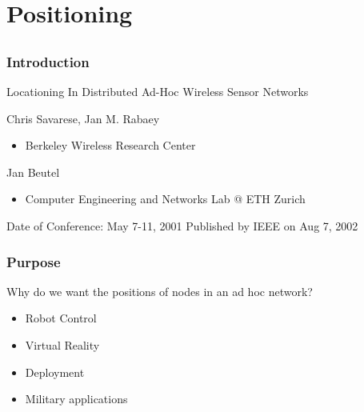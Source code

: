 \section{Positioning}
\subsection*{}


\begin{frame}[t]
  \frametitle{Introduction}
  Locationing In Distributed Ad-Hoc Wireless Sensor Networks

  Chris Savarese, Jan M. Rabaey
  \begin{itemize}
  \item Berkeley Wireless Research Center
  \end{itemize}

  Jan Beutel
  \begin{itemize}
  \item Computer Engineering and Networks Lab @ ETH Zurich
  \end{itemize}

  Date of Conference: May 7-11, 2001
  Published by IEEE on Aug 7, 2002

  \begin{flushleft}
    \begin{tiny}
      \begin{minipage}{1.0\linewidth}
      \end{minipage}
    \end{tiny}
  \end{flushleft}

  \vfill
\end{frame}

\begin{frame}[t]
  \frametitle{Purpose}
  
  Why do we want the positions of nodes in an ad hoc network?
  \begin{itemize}
  \item Robot Control
  \item Virtual Reality
  \item Deployment
  \item Military applications
  \end{itemize}

  \vfill
  
  \begin{flushleft}
    \begin{tiny}
      \begin{minipage}{1.0\linewidth}
      \end{minipage}
    \end{tiny}
  \end{flushleft}

  
\end{frame}

